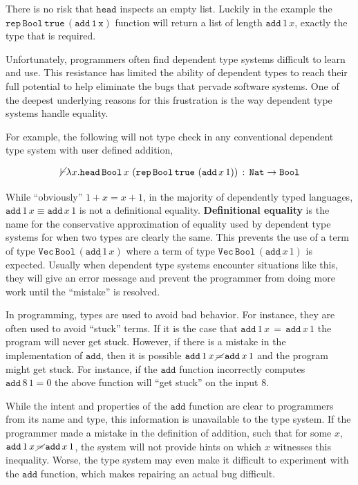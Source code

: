 There is no risk that $\mathtt{head}$ inspects an empty list.
Luckily in the example the $\mathtt{\mathtt{rep}\,\mathtt{Bool}\,\mathtt{true}\,\left(\mathtt{add}\,1\,x\right)}$ function will return a list of length $\mathtt{add}\,1\,x$, exactly the type that is required.


Unfortunately, programmers often find dependent type systems difficult to learn and use.
This resistance has limited the ability of dependent types to reach their full potential to help eliminate the bugs that pervade software systems.
One of the deepest underlying reasons for this frustration is the way dependent type systems handle equality.

For example, the following will not type check in any conventional dependent type system with user defined addition,

\[
\cancel{\vdash}\lambda x.\mathtt{head}\,\mathtt{Bool}\,x\,\left(\mathtt{rep}\,\mathtt{Bool}\,\mathtt{true}\,\left(\mathtt{add}\,x\,1\right)\right)\,:\,\mathtt{Nat}\rightarrow\mathtt{Bool}
\]

While ``obviously'' $1+x=x+1$, in the majority of dependently typed languages, $\mathtt{add}\,1\,x\equiv\mathtt{add}\,x\,1$ is not a definitional equality.
\textbf{Definitional equality} is the name for the conservative approximation of equality used by dependent type systems for when two types are clearly the same.
This prevents the use of a term of type
$\mathtt{Vec}\,\mathtt{Bool}\,\left(\underline{\mathtt{add}\,1\,x}\right)$
where a term of type
$\mathtt{Vec}\,\mathtt{Bool}\,\left(\underline{\mathtt{add}\,x\,1}\right)$
is expected.
Usually when dependent type systems encounter situations like this, they will give an error message and prevent the programmer from doing more work until the ``mistake'' is resolved.

In programming, types are used to avoid bad behavior.
For instance, they are often used to avoid ``stuck'' terms.
If it is the case that $\mathtt{add}\,1\,x\,=\,\mathtt{add}\,x\,1$ the program will never get stuck.
However, if there is a mistake in the implementation of $\mathtt{add}$, then it is possible $\mathtt{add}\,1\,x\,\cancel{=}\,\mathtt{add}\,x\,1$ and the program might get stuck.
For instance, if the $\mathtt{add}$ function incorrectly computes $\mathtt{add}\,8\,1=0$ the above function will ``get stuck'' on the input $8$.

While the intent and properties of the $\mathtt{add}$ function are clear to programmers from its name and type, this information is unavailable to the type system.
If the programmer made a mistake in the definition of addition, such that for some $x$, $\mathtt{add}\,1\,x\,\cancel{=}\,\mathtt{add}\,x\,1$, the system will not provide hints on which $x$ witnesses this inequality.
Worse, the type system may even make it difficult to experiment with the $\mathtt{add}$ function, which makes repairing an actual bug difficult.


